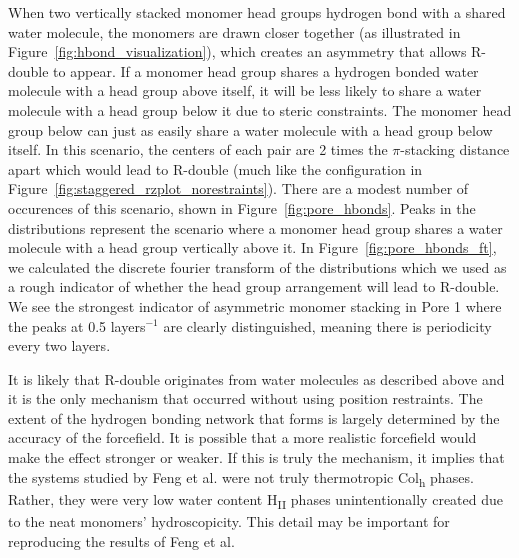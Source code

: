 \documentclass[journal=jpcbfk,manuscript=article]{achemso}
\begin{document}
  When two vertically stacked monomer head groups hydrogen bond with a shared water 
  molecule, the monomers are drawn closer together (as illustrated in 
  Figure~\ref{fig:hbond_visualization}), which creates an asymmetry that allows 
  R-double to appear. If a monomer head group shares a hydrogen bonded water molecule
  with a head group above itself, it will be less likely to share a water molecule 
  with a head group below it due to steric constraints. The monomer head group below
  can just as easily share a water molecule with a head group below itself. In this scenario,
  the centers of each pair are 2 times the $\pi$-stacking distance apart which would
  lead to R-double (much like the configuration in Figure~\ref{fig:staggered_rzplot_norestraints}). There are
  a modest number of occurences of this scenario, shown in Figure~\ref{fig:pore_hbonds}. 
  Peaks in the distributions represent the scenario where a monomer head group shares a 
  water molecule with a head group vertically above it. In Figure~\ref{fig:pore_hbonds_ft},
  we calculated the discrete fourier transform of the distributions which we used as a rough 
  indicator of whether the head group arrangement will lead to R-double. We see the 
  strongest indicator of asymmetric monomer stacking in Pore 1 where the peaks at 0.5
  layers$^{-1}$ are clearly distinguished, meaning there is periodicity every two layers.
  
  It is likely that R-double originates from water molecules as described above and it is the 
  only mechanism that occurred without using position restraints. The extent of the hydrogen
  bonding network that forms is largely determined by the accuracy of the forcefield. It is 
  possible that a more realistic forcefield would make the effect stronger or weaker. If 
  this is truly the mechanism, it implies that the systems studied by Feng et 
  al.\cite{feng_scalable_2014,feng_thin_2016} were not truly thermotropic Col\textsubscript{h}
  phases. Rather, they were very low water content H\textsubscript{II} phases unintentionally
  created due to the neat monomers' hydroscopicity. This detail may be important for reproducing
  the results of Feng et al.
\end{document}
